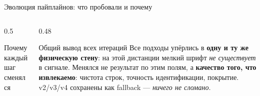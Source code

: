 \documentclass[aspectratio=169,10pt]{beamer}
\newcommand{\hl}[1]{{\bfseries\color{accent}#1}}
\newcommand{\hr}[1]{{\bfseries\color{redtag}#1}}
\begin{document}
\begin{frame}{Эволюция пайплайнов: что пробовали и почему}
\begin{columns}[T,onlytextwidth]
\begin{column}{0.5\textwidth}
\begin{block}{Почему каждый шаг сменялся}
      \end{block}
    \end{column}
    \begin{column}{0.48\textwidth}
      \begin{block}{Общий вывод всех итераций}\footnotesize
        Все подходы упёрлись в \hr{одну и ту же физическую стену}: на этой
        дистанции мелкий шрифт \emph{не существует} в сигнале. Менялся не
        результат по этим полям, а \hl{качество того, что извлекаемо}:
        чистота строк, точность идентификации, покрытие.
        \vspace{0.25em}\\ v2/v3/v4 сохранены как fallback — \emph{ничего не сломано}.
      \end{block}
    \end{column}
  \end{columns}
\end{frame}
\end{document}
